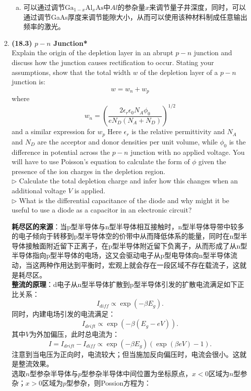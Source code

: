 \documentclass[reqno,a4paper,12pt]{amsart}
\begin{document}
\begin{enumerate}[1.]
\begin{tcolorbox}[breakable, colback = black!5!white, colframe = black]
\begin{enumerate}[(a)]
\item 可以通过调节$\text{Ga}_{1-x}\text{Al}_x\text{As}$中$Al$的参杂量$x$来调节量子井深度，同时，可以通过调节GaAs厚度来调节能隙大小，从而可以使用该种材料制成任意输出频率的激光。

\end{enumerate}
\end{tcolorbox}

\item \textbf{(18.3) $p-n$ Junction*} \\
Explain the origin of the depletion layer in an abrupt $p-n$ junction and discuss how the junction causes rectification to occur. Stating your assumptions, show that the total width $w$ of the depletion layer of a $p-n$ junction is: 
\[
	w = w_n+w_p
\]
where 
\[
	w_n = \left( \frac{2\epsilon_r\epsilon_0 N_A\phi_0}{eN_D(N_A+N_D)} \right)^{1/2}
\]
and a similar expression for $w_p$ Here $\epsilon_r$ is the relative permittivity and $N_A$ and $N_D$ are the acceptor and donor densities per unit volume, while $\phi_0$ is the difference in potential across the $p-n$ junction with no applied voltage. You will have to use Poisson's equation to calculate the form of $\phi$ given the presence of the ion charges in the depletion region. \\
$\triangleright$ Calculate the total depletion charge and infer how this changes when an additional voltage $V$ is applied. \\
$\triangleright$ What is the differential capacitance of the diode and why might it be useful to use a diode as a capacitor in an electronic circuit?
\begin{tcolorbox}[breakable, colback = black!5!white, colframe = black]
\textbf{耗尽区的来源}：当p型半导体与n型半导体相互接触时，n型半导体导带中较多的电子倾向于转移到p型半导体空的价带中从而降低体系的能量，同时在n型半导体接触面附近留下正离子，在p型半导体附近留下负离子，从而形成了从n型半导体指向p型半导体的电场，这又会驱动电子从p型电导体向n型半导体流动，当这两种作用达到平衡时，宏观上就会存在一段区域不存在载流子，这就是耗尽区。 \\
\textbf{整流的原理}：d电子从n型半导体扩散到p型半导体引发的扩散电流满足如下正比关系：
\[
	I_{diff} \propto \exp(-\beta E_g).
\] 
同时，内建电场引发的电流满足：
\[
	I_{drift} \propto \exp(-\beta (E_g-eV)).
\] 
其中$V$为外加偏压，此时总电流为：
\[
	I = I_{drift} - I_{diff} \propto \exp(-\beta E_g) (\exp(\beta eV) - 1).
\]
注意到当电压为正向时，电流较大；但当施加反向偏压时，电流会很小。这就是整流效果。 \\
选取$n$型参杂半导体与$p$型参杂半导体中间位置为坐标原点，$x<0$区域为$n$型参杂；$x>0$区域为$p$型参杂，则Possion方程为：

\end{tcolorbox}
\end{enumerate}
\end{document}

